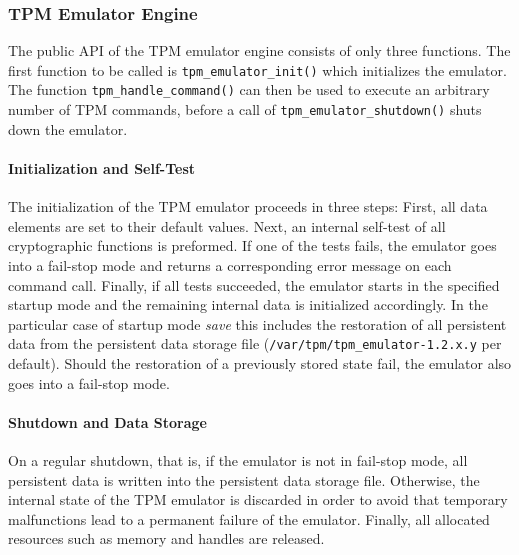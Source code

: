 \documentclass[11pt,letterpaper]{article}
\newcommand{\file}[1]{\small\texttt{#1}\normalsize}
\newcommand{\func}[1]{\small\texttt{#1}\normalsize}
\begin{document}
\subsubsection{TPM Emulator Engine}

The public API of the TPM emulator engine consists of only three functions. The first function
to be called is \func{tpm\_emulator\_init()} which initializes the emulator. The function
\func{tpm\_\-handle\_\-command()} can then be used to execute an arbitrary number of TPM commands,
before a call of \func{tpm\_emulator\_shutdown()} shuts down the emulator.

\paragraph{Initialization and Self-Test}
The initialization of the TPM emulator proceeds in three steps:
First, all data elements are set to their default values. %
Next, an internal self-test of all cryptographic functions
is preformed. If one of the tests fails, the emulator goes into a fail-stop mode and returns
a corresponding error message on each command call. Finally, if all tests succeeded, the emulator
starts in the specified startup mode and the remaining internal data is initialized accordingly.
In the particular case of startup mode \emph{save} this includes the restoration of all persistent
data from the persistent data storage file (\file{/var/tpm/tpm\_emulator-1.2.x.y} per default).
Should the restoration of a previously stored state fail, the emulator also goes into a fail-stop
mode.

\paragraph{Shutdown and Data Storage}
On a regular shutdown, that is, if the emulator is not in fail-stop mode, all persistent data is
written into the persistent data storage file. Otherwise, the internal state of the TPM emulator
is discarded in order to avoid that temporary malfunctions lead to a permanent failure of the
emulator. Finally, all allocated resources such as memory and handles are released.
\end{document}
